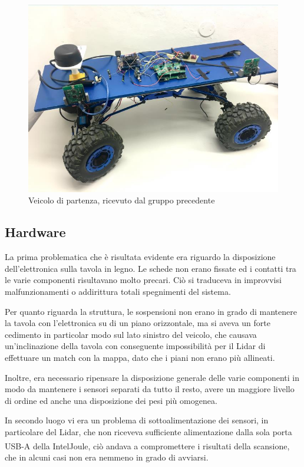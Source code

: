 \begin{figure}[h] 
\centering    
\includegraphics[scale=0.33]{Capitolo1/Figs/bipe.jpg}
\caption[Veicolo ricevuto dal gruppo precedente]{Veicolo di partenza, ricevuto dal gruppo precedente}
\label{fig:bipe}
\end{figure}
\subsection{Hardware}
\label{subsection1.2.1}
La prima problematica che è risultata evidente era riguardo la disposizione dell’elettronica sulla tavola in legno. Le schede non erano fissate ed i contatti tra le varie componenti risultavano molto precari. Ciò si traduceva in improvvisi malfunzionamenti o addirittura totali spegnimenti del sistema.

Per quanto riguarda la struttura, le sospensioni non erano in grado di mantenere la tavola con l’elettronica su di un piano orizzontale, ma si aveva un forte cedimento in particolar modo sul lato sinistro del veicolo, che causava un’inclinazione della tavola con conseguente impossibilità per il Lidar di effettuare un match con la mappa, dato che i piani non erano più allineati.

Inoltre, era necessario ripensare la disposizione generale delle varie componenti in modo da mantenere i sensori separati da tutto il resto, avere un maggiore livello di ordine ed anche una disposizione dei pesi più omogenea.

In secondo luogo vi era un problema di sottoalimentazione dei sensori, in particolare del Lidar, che non riceveva sufficiente alimentazione dalla sola porta USB-A della Intel\textsuperscript\textregistered Joule\texttrademark \hspace{1mm}, ciò andava a compromettere i risultati della scansione, che in alcuni casi non era nemmeno in grado di avviarsi.


